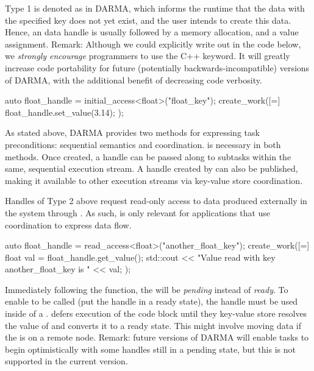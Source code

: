 Type 1 is denoted as  in DARMA, 
which informs the runtime that the data with the 
specified key does not yet exist, and the user intends to 
create this data.%
Hence, an  data handle is usually 
followed by a memory allocation, and a value assignment. 
Remark: Although we could explicitly write out \ahandleT in the code below,
we \emph{strongly encourage} programmers to use the C++  keyword.
It will greatly increase code portability for future (potentially backwards-incompatible) versions of DARMA,
with the additional benefit of decreasing code verbosity.

\begin{CppCode}
auto float_handle = initial_access<float>("float_key");
create_work([=]{
  float_handle.set_value(3.14);
});
\end{CppCode}
As stated above, DARMA provides two methods for expressing task preconditions: sequential semantics and coordination.
 is necessary in both methods.
Once created, a handle can be passed along to subtasks within the same, sequential execution stream.
A handle created by  can also be published, making it available to other execution streams via key-value store coordination.

Handles of Type 2 above request read-only access to data produced externally in the system through . 
As such,  is only relevant for applications that use coordination to express data flow.
\begin{CppCode}
auto float_handle = read_access<float>("another_float_key");
create_work([=]{
  float val = float_handle.get_value();
  std::cout << "Value read with key another_float_key is " << val;  
});
\end{CppCode}

Immediately following the  function, the \ahandle will be \emph{pending} instead of \emph{ready}.
To enable  to be called (put the handle in a ready state), the handle must be used inside of a .
\cwork defers execution of the code block until they key-value store resolves the value of  and converts it to a ready state.
This might involve moving data if the  is on a remote node.
Remark: future versions of DARMA will enable tasks to begin optimistically with some handles still in a pending state, but this is not supported in the current version.

